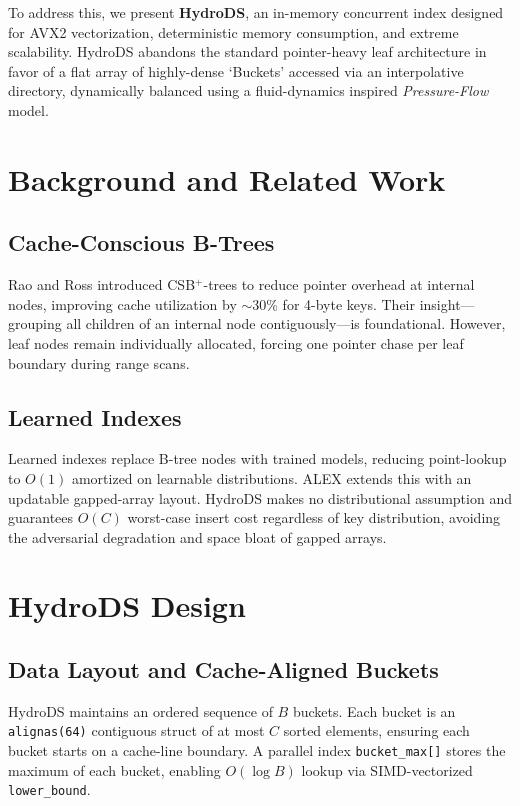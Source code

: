 \documentclass[sigconf]{acmart}
\begin{document}
To address this, we present \textbf{HydroDS}, an in-memory concurrent index designed for AVX2 vectorization, deterministic memory consumption, and extreme scalability. HydroDS abandons the standard pointer-heavy leaf architecture in favor of a flat array of highly-dense `Buckets' accessed via an interpolative directory, dynamically balanced using a fluid-dynamics inspired \textit{Pressure-Flow} model.

\section{Background and Related Work}

\subsection{Cache-Conscious B-Trees}
Rao and Ross introduced CSB$^+$-trees to reduce pointer overhead at internal nodes, improving cache utilization by $\sim$30\% for 4-byte keys. Their insight---grouping all children of an internal node contiguously---is foundational. However, leaf nodes remain individually allocated, forcing one pointer chase per leaf boundary during range scans.

\subsection{Learned Indexes}
Learned indexes replace B-tree nodes with trained models, reducing point-lookup to $O(1)$ amortized on learnable distributions. ALEX extends this with an updatable gapped-array layout. HydroDS makes no distributional assumption and guarantees $O(C)$ worst-case insert cost regardless of key distribution, avoiding the adversarial degradation and space bloat of gapped arrays.

\section{HydroDS Design}

\subsection{Data Layout and Cache-Aligned Buckets}
HydroDS maintains an ordered sequence of $B$ buckets. Each bucket is an \texttt{alignas(64)} contiguous struct of at most $C$ sorted elements, ensuring each bucket starts on a cache-line boundary. A parallel index \texttt{bucket\_max[]} stores the maximum of each bucket, enabling $O(\log B)$ lookup via SIMD-vectorized \texttt{lower\_bound}. 
\end{document}
